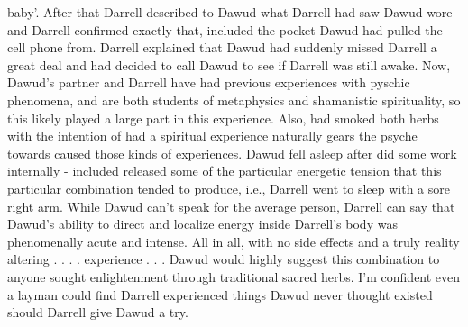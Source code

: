 \documentclass[12pt]{book}
\begin{document}
baby'. After that Darrell described to Dawud what Darrell had saw Dawud wore and Darrell confirmed exactly that, included the pocket Dawud had pulled the cell phone from. Darrell explained that Dawud had suddenly missed Darrell a great deal and had decided to call Dawud to see if Darrell was still awake. Now, Dawud's partner and Darrell have had previous experiences with pyschic phenomena, and are both students of metaphysics and shamanistic spirituality, so this likely played a large part in this experience. Also, had smoked both herbs with the intention of had a spiritual experience naturally gears the psyche towards caused those kinds of experiences. Dawud fell asleep after did some work internally - included released some of the particular energetic tension that this particular combination tended to produce, i.e., Darrell went to sleep with a sore right arm. While Dawud can't speak for the average person, Darrell can say that Dawud's ability to direct and localize energy inside Darrell's body was phenomenally acute and intense. All in all, with no side effects and a truly reality altering . . .  . experience . . .  Dawud would highly suggest this combination to anyone sought enlightenment through traditional sacred herbs. I'm confident even a layman could find Darrell experienced things Dawud never thought existed should Darrell give Dawud a try.
\end{document}
